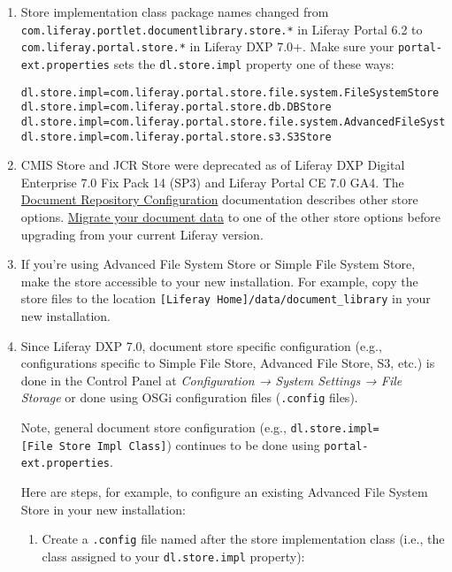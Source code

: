 \begin{enumerate}
\def\labelenumi{\arabic{enumi}.}
\item
  Store implementation class package names changed from
  \texttt{com.liferay.portlet.documentlibrary.store.*} in Liferay Portal
  6.2 to \texttt{com.liferay.portal.store.*} in Liferay DXP 7.0+. Make
  sure your \texttt{portal-ext.properties} sets the
  \texttt{dl.store.impl} property one of these ways:

\begin{verbatim}
dl.store.impl=com.liferay.portal.store.file.system.FileSystemStore
dl.store.impl=com.liferay.portal.store.db.DBStore
dl.store.impl=com.liferay.portal.store.file.system.AdvancedFileSystemStore
dl.store.impl=com.liferay.portal.store.s3.S3Store
\end{verbatim}
\item
  CMIS Store and JCR Store were deprecated as of Liferay DXP Digital
  Enterprise 7.0 Fix Pack 14 (SP3) and Liferay Portal CE 7.0 GA4. The
  \href{/docs/7-0/deploy/-/knowledge_base/d/document-repository-configuration}{Document
  Repository Configuration} documentation describes other store options.
  \href{/docs/7-0/deploy/-/knowledge_base/d/document-repository-configuration\#cmis-store}{Migrate
  your document data} to one of the other store options before upgrading
  from your current Liferay version.
\item
  If you're using Advanced File System Store or Simple File System
  Store, make the store accessible to your new installation. For
  example, copy the store files to the location
  \texttt{{[}Liferay\ Home{]}/data/document\_library} in your new
  installation.
\item
  Since Liferay DXP 7.0, document store specific configuration (e.g.,
  configurations specific to Simple File Store, Advanced File Store, S3,
  etc.) is done in the Control Panel at \emph{Configuration → System
  Settings → File Storage} or done using OSGi configuration files
  (\texttt{.config} files).

  Note, general document store configuration (e.g.,
  \texttt{dl.store.impl={[}File\ Store\ Impl\ Class{]}}) continues to be
  done using \texttt{portal-ext.properties}.

  Here are steps, for example, to configure an existing Advanced File
  System Store in your new installation:

  \begin{enumerate}
  \def\labelenumii{\arabic{enumii}.}
  \item
    Create a \texttt{.config} file named after the store implementation
    class (i.e., the class assigned to your \texttt{dl.store.impl}
    property):


\end{enumerate}
\end{enumerate}
